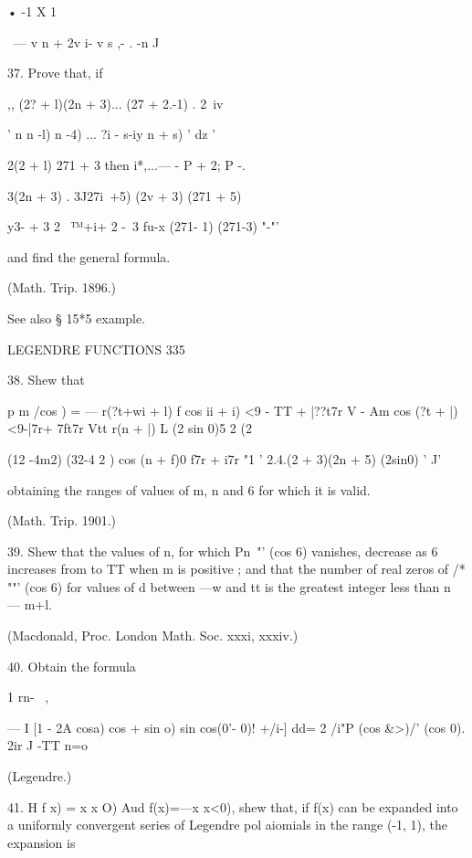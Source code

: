 {{{{• -1 X 1 \ 

\ — v n + 2v i- v s ,- 
. -n J 



37. Prove that, if 



,, (2?  + l)(2n + 3)... (27  + 2.-1)   . 2\ iv   

 ' n n -l) n -4) ... ?i - s-iy  n + s)  ' dz  ' 

2(2  + l)   271 + 3   
then   i*,...—  - P  + 2; P -. 

3(2n + 3) . 3J27i\ +5) (2v  + 3) (271 + 5) 

y3-   + 3 2 \  ™+i+ 2 -\ 3 fu-x (271- 1) (271-3) "-"' 



and find the general formula. 



(Math. Trip. 1896.) 



See also § 15*5 example. 



LEGENDRE FUNCTIONS 335 



38. Shew that 



p m /cos  ) = — r(?t+wi + l) f cos   ii + i) <9 -  TT + |??t7r   V - Am  cos (?t + |)<9-|7r+ 7ft7r  
Vtt r(n + |) L (2 sin 0)5 2 (2%

(12 -4m2) (32-4 2 ) cos (n + f)0 f7r +   i7r  "1 
' 2.4.(2  + 3)(2n + 5) (2sin0)  ' J' 

obtaining the ranges of values of m, n and 6 for which it is valid. 

(Math. Trip. 1901.) 

39. Shew that the values of n, for which Pn~"' (cos 6) vanishes, decrease as 6 increases 
from to TT when m is positive ; and that the number of real zeros of /* ""' (cos 6) for 
values of d between —w and tt is the greatest integer less than n — m+l. 

(Macdonald, Proc. London Math. Soc. xxxi, xxxiv.) 

40. Obtain the formula 

1 rn- \  ,   

— I [1 - 2A cosa) cos + sin o) sin cos(0'- 0)! +/i-]  dd= 2 /i"P  (cos \&>)/'  (cos 0). 
2ir J -TT n=o 

(Legendre.) 

41. H f x) = x  x O) Aud f(x)=—x  x<0), shew that, if f(x) can be expanded 
into a uniformly convergent series of Legendre pol aiomials in the range (-1, 1), the 
expansion is 

}}}}
